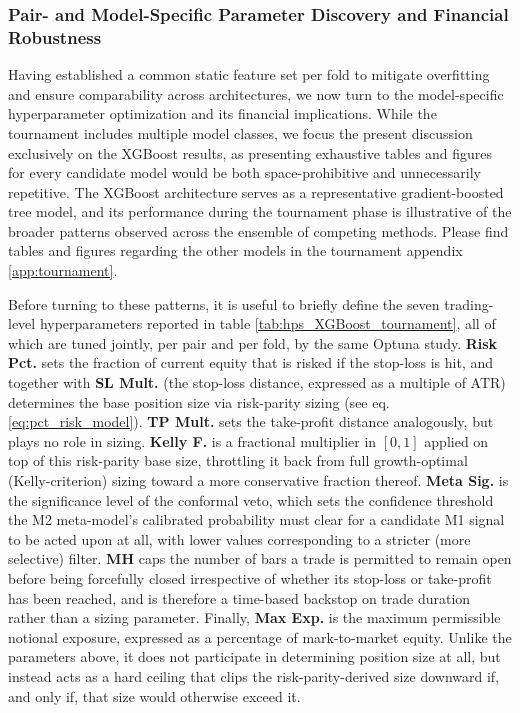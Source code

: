 \documentclass[12pt, a4paper]{article}
\begin{document}
\subsubsection{Pair- and Model-Specific Parameter Discovery and Financial Robustness}\label{sec:tournament_trading_hps}

Having established a common static feature set per fold to mitigate overfitting and ensure comparability across architectures, we now turn to the model-specific hyperparameter 
optimization and its financial implications. While the tournament includes multiple model classes, we focus the present discussion exclusively on the XGBoost results, 
as presenting exhaustive tables and figures for every candidate model would be both space-prohibitive and unnecessarily repetitive. The XGBoost architecture serves as a 
representative gradient-boosted tree model, and its performance during the tournament phase is illustrative of the broader patterns observed across the ensemble of competing methods.
Please find tables and figures regarding the other models in the tournament appendix \ref{app:tournament}.



Before turning to these patterns, it is useful to briefly define the seven trading-level hyperparameters reported in table \ref{tab:hps_XGBoost_tournament}, all of which are tuned 
jointly, per pair and per fold, by the same Optuna study. \textbf{Risk Pct.} sets the fraction of current equity that is risked if the stop-loss is hit, and together 
with \textbf{SL Mult.} (the stop-loss distance, expressed as a multiple of ATR) determines the base position size via risk-parity sizing (see eq. \ref{eq:pct_risk_model}). 
\textbf{TP Mult.} sets the take-profit distance analogously, but plays no role in sizing. 
\textbf{Kelly F.} is a fractional multiplier in $[0,1]$ applied on top of this risk-parity base size, throttling it back from full growth-optimal (Kelly-criterion) sizing toward a 
more conservative fraction thereof. \textbf{Meta Sig.} is the significance level of the conformal veto, which sets the confidence threshold the M2 meta-model's calibrated probability 
must clear for a candidate M1 signal to be acted upon at all, with lower values corresponding to a stricter (more selective) filter. \textbf{MH} caps the number of bars a trade is 
permitted to remain open before being forcefully closed irrespective of whether its stop-loss or take-profit has been reached, and is therefore a time-based backstop on trade duration 
rather than a sizing parameter. Finally, \textbf{Max Exp.} is the maximum permissible notional exposure, expressed as a percentage of mark-to-market equity. Unlike the parameters 
above, it does not participate in determining position size at all, but instead acts as a hard ceiling that clips the risk-parity-derived size downward if, and only if, that size 
would otherwise exceed it.
\end{document}
